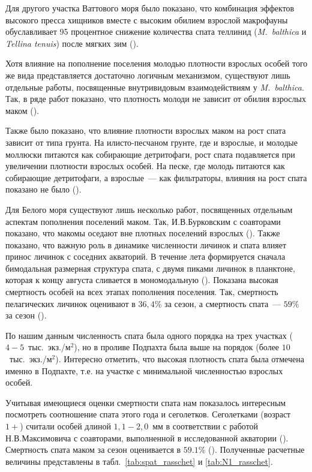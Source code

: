 Для другого участка Ваттового моря было показано, что комбинация эффектов высокого пресса хищников вместе с высоким обилием взрослой макрофауны обуславливает 95 процентное снижение количества спата теллинид (\textit{M.~balthica} и \textit{Tellina tenuis}) после мягких зим (\cite{Flatch_2003}). 

Хотя влияние на пополнение поселения молодью плотности взрослых особей того же вида представляется достаточно логичным механизмом, существуют лишь отдельные работы, посвященные внутривидовым взаимодействиям у \textit{M.~balthica}. 
Так, в ряде работ показано, что плотность молоди не зависит от обилия взрослых маком (\cite{Olafsson_1989, Vincent_et_al_1989, Beukema_et_al_2001, Richards_et_al_2002}). 

 Также было показано, что влияние плотности взрослых маком на рост спата зависит от типа грунта. 
На илисто-песчаном грунте, где и взрослые, и молодые моллюски питаются как собирающие детритофаги, рост спата подавляется при увеличении плотности взрослых особей. 
На песке, где молодь питаются как собирающие детритофаги, а взрослые~--- как фильтраторы, влияния на рост спата показано не было (\cite{Olafsson_1989}).

Для Белого моря существуют лишь несколько работ, посвященных отдельным аспектам пополнения поселений маком. 
Так, И.В.Бурковским с соавторами показано, что макомы оседают вне плотных поселений взрослых (\cite{Burkovskiy_et_al_1998}). 
Также показано, что важную роль в динамике численности личинок и спата влияет принос личинок с соседних акваторий. 
В течение лета формируется сначала бимодальная размерная структура спата, с двумя пиками личинок в планктоне, которая к концу августа сливается в мономодальную (\cite{Zubakha_et_al_2000}). 
Показана высокая смертность особей на всех этапах пополнения поселения. Так, смертность пелагических личинок оценивают в $36,4$\% за сезон, а смертность спата~--- $59$\% за сезон (\cite{Burkovskiy_et_al_1998}).

\par\bigskip
По нашим данным численность спата была одного порядка на трех участках ($4-5$~тыс.~экз./м$^2$), но в проливе Подпахта была выше на порядок (более $10$~тыс.~экз./м$^2$). 
Интересно отметить, что высокая плотность спата была отмечена именно в Подпахте, т.е. на участке с минимальной численностью взрослых особей. 

Учитывая имеющиеся оценки смертности спата нам показалось интересным посмотреть соотношение спата этого года и сеголетков. 
Сеголетками (возраст $1+$) считали особей длиной $1,1-2,0$~мм в соответствии с работой Н.В.Максимовича с соавторами, выполненной в исследованной акватории (\cite{Maximovich_et_al_1992}). 
Смертность спата маком за сезон оценивается в $59.1$\% (\cite{Burkovskiy_et_al_1998}). Полученные расчетные величины представлены в табл.~\ref{tab:spat_rasschet} и \ref{tab:N1_rasschet}.

